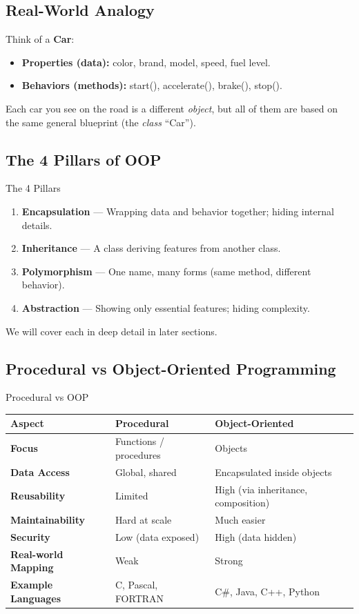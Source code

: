 \documentclass[11pt,a4paper]{article}
\newcommand{\rowcolortop}{\rowcolor{tableHead}\color{white}\bfseries}
\newcommand{\rowcolorlight}{\rowcolor{tableAlt}}
\begin{document}
\subsection{Real-World Analogy}

Think of a \textbf{Car}:
\begin{itemize}[leftmargin=*]
    \item \textbf{Properties (data):} color, brand, model, speed, fuel level.
    \item \textbf{Behaviors (methods):} start(), accelerate(), brake(), stop().
\end{itemize}
Each car you see on the road is a different \textit{object}, but all of them are based on the same general blueprint (the \textit{class} ``Car'').

\subsection{The 4 Pillars of OOP}

\begin{keyBox}{The 4 Pillars}
\begin{enumerate}[leftmargin=*]
    \item \textbf{Encapsulation} — Wrapping data and behavior together; hiding internal details.
    \item \textbf{Inheritance} — A class deriving features from another class.
    \item \textbf{Polymorphism} — One name, many forms (same method, different behavior).
    \item \textbf{Abstraction} — Showing only essential features; hiding complexity.
\end{enumerate}
\end{keyBox}

We will cover each in deep detail in later sections.

\subsection{Procedural vs Object-Oriented Programming}

\begin{compareBox}{Procedural vs OOP}
\begin{tabularx}{\linewidth}{|>{\bfseries}p{3.5cm}|X|X|}
\hline
\rowcolortop \color{white}Aspect & \color{white}Procedural & \color{white}Object-Oriented \\
\hline
Focus & Functions / procedures & Objects \\
\rowcolorlight
Data Access & Global, shared & Encapsulated inside objects \\
Reusability & Limited & High (via inheritance, composition) \\
\rowcolorlight
Maintainability & Hard at scale & Much easier \\
Security & Low (data exposed) & High (data hidden) \\
\rowcolorlight
Real-world Mapping & Weak & Strong \\
Example Languages & C, Pascal, FORTRAN & C\#, Java, C++, Python \\
\hline
\end{tabularx}
\end{compareBox}
\end{document}
